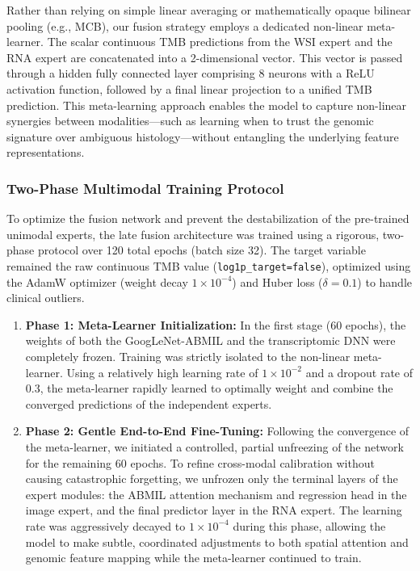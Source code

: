 \documentclass[11pt,a4paper]{article}
\begin{document}
Rather than relying on simple linear averaging or mathematically opaque bilinear pooling (e.g., MCB), our fusion strategy employs a dedicated non-linear meta-learner. The scalar continuous TMB predictions from the WSI expert and the RNA expert are concatenated into a 2-dimensional vector. This vector is passed through a hidden fully connected layer comprising 8 neurons with a ReLU activation function, followed by a final linear projection to a unified TMB prediction. This meta-learning approach enables the model to capture non-linear synergies between modalities—such as learning when to trust the genomic signature over ambiguous histology—without entangling the underlying feature representations.

\subsubsection{Two-Phase Multimodal Training Protocol}
To optimize the fusion network and prevent the destabilization of the pre-trained unimodal experts, the late fusion architecture was trained using a rigorous, two-phase protocol over 120 total epochs (batch size 32). The target variable remained the raw continuous TMB value (\texttt{log1p\_target=false}), optimized using the AdamW optimizer (weight decay $1\times 10^{-4}$) and Huber loss ($\delta=0.1$) to handle clinical outliers.

\begin{enumerate}
    \item \textbf{Phase 1: Meta-Learner Initialization:} In the first stage (60 epochs), the weights of both the GoogLeNet-ABMIL and the transcriptomic DNN were completely frozen. Training was strictly isolated to the non-linear meta-learner. Using a relatively high learning rate of $1\times 10^{-2}$ and a dropout rate of 0.3, the meta-learner rapidly learned to optimally weight and combine the converged predictions of the independent experts.

    \item \textbf{Phase 2: Gentle End-to-End Fine-Tuning:} Following the convergence of the meta-learner, we initiated a controlled, partial unfreezing of the network for the remaining 60 epochs. To refine cross-modal calibration without causing catastrophic forgetting, we unfrozen only the terminal layers of the expert modules: the ABMIL attention mechanism and regression head in the image expert, and the final predictor layer in the RNA expert. The learning rate was aggressively decayed to $1\times 10^{-4}$ during this phase, allowing the model to make subtle, coordinated adjustments to both spatial attention and genomic feature mapping while the meta-learner continued to train.
\end{enumerate}
\end{document}
